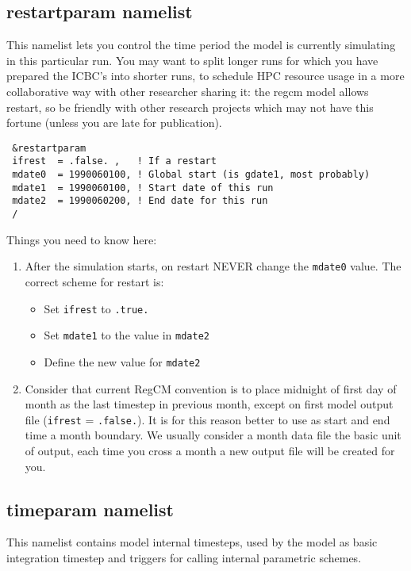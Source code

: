 \subsection{restartparam namelist}

This namelist lets you control the time period the model is currently simulating
in this particular run. You may want to split longer runs for which you have
prepared the ICBC's into shorter runs, to schedule HPC resource usage in a more
collaborative way with other researcher sharing it: the regcm model allows
restart, so be friendly with other research projects which may not have this
fortune (unless you are late for publication).

{\footnotesize
\begin{Verbatim}
 &restartparam
 ifrest  = .false. ,   ! If a restart
 mdate0  = 1990060100, ! Global start (is gdate1, most probably)
 mdate1  = 1990060100, ! Start date of this run
 mdate2  = 1990060200, ! End date for this run
 /
\end{Verbatim}
}

Things you need to know here:

\begin{enumerate}
\item After the simulation starts, on restart NEVER change the \verb=mdate0=
value. The correct scheme for restart is:
\begin{itemize}
\item Set \verb=ifrest= to \verb=.true.=
\item Set \verb=mdate1= to the value in \verb=mdate2=
\item Define the new value for \verb=mdate2=
\end{itemize}
\item Consider that current RegCM convention is to place midnight of first
day of month as the last timestep in previous month, except on first model
output file (\verb=ifrest= = \verb=.false.=). It is for this reason better
to use as start and end time a month boundary. We usually consider a month
data file the basic unit of output, each time you cross a month a new output
file will be created for you.
\end{enumerate}

\subsection{timeparam namelist}

This namelist contains model internal timesteps, used by the model as basic
integration timestep and triggers for calling internal parametric schemes.

